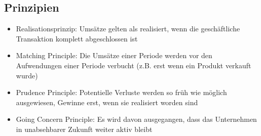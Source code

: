 \subsection{Prinzipien}
\begin{itemize}
	\item Realisationsprinzip: Umsätze gelten als realisiert, wenn die geschäftliche Transaktion komplett abgeschlossen ist
	\item Matching Principle: Die Umsätze einer Periode werden vor den Aufwendungen einer Periode verbucht (z.B. erst wenn ein Produkt verkauft wurde)
	\item Prudence Principle: Potentielle Verluste werden so früh wie möglich ausgewiesen, Gewinne erst, wenn sie realisiert worden sind
	\item Going Concern Principle: Es wird davon ausgegangen, dass das Unternehmen in unabsehbarer Zukunft weiter aktiv bleibt
\end{itemize}


